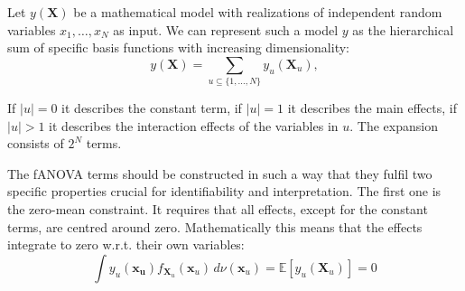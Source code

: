 \begin{definition}
Let $y(\boldsymbol{X})$  be a mathematical model with realizations of independent random variables $x_1, \dots, x_N$ as input. We can represent such a model $y$ as the hierarchical sum of specific basis functions with increasing dimensionality:
\begin{equation}
    y(\boldsymbol{X}) = \sum_{u \subseteq \{1, \dots, N\}} y_{u}(\boldsymbol{X}_u),
    \label{eq:fanova_decomposition}
\end{equation}
\end{definition}

If $|u| = 0$ it describes the constant term, if $|u| = 1$ it describes the main effects, if $|u| > 1$ it describes the interaction effects of the variables in $u$. The expansion consists of $2^N$ terms.\par


The fANOVA terms should be constructed in such a way that they fulfil two specific properties crucial for identifiability and interpretation.
The first one is the zero-mean constraint. It requires that all effects, except for the constant terms, are centred around zero.
Mathematically this means that the effects integrate to zero w.r.t. their own variables:
\begin{equation}
    \int y_u(\boldsymbol{x_u}) f_{\boldsymbol{X}_u}(\boldsymbol{x}_u) \, d\nu (\boldsymbol{x}_u) = \mathbb{E}[y_u(\boldsymbol{X}_u)] = 0
    \label{eq:zero_mean_condition}
\end{equation}

